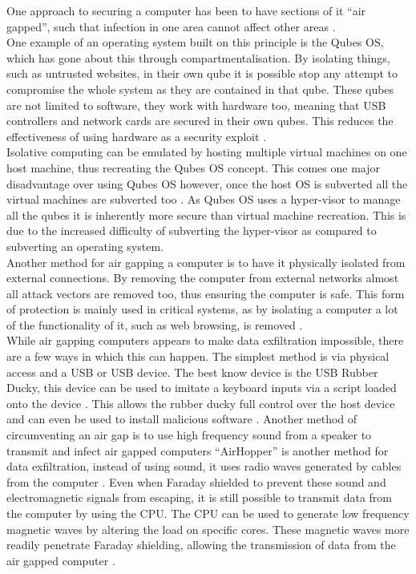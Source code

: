\label{Ch2 Sec3}

One approach to securing a computer has been to have sections of it “air gapped”, such that infection in one area cannot affect other areas \cite{Reference19}.\\

One example of an operating system built on this principle is the Qubes OS, which has gone about this through compartmentalisation.
By isolating things, such as untrusted websites, in their own qube it is possible stop any attempt to compromise the whole system as they are contained in that qube.
These qubes are not limited to software, they work with hardware too, meaning that USB controllers and network cards are secured in their own qubes.
This reduces the effectiveness of using hardware as a security exploit \cite{Reference20}.\\

Isolative computing can be emulated by hosting multiple virtual machines on one host machine, thus recreating the Qubes OS concept.
This comes one major disadvantage over using Qubes OS however, once the host OS is subverted all the virtual machines are subverted too \cite{Reference21}.
As Qubes OS uses a hyper-visor to manage all the qubes it is inherently more secure than virtual machine recreation.
This is due to the increased difficulty of subverting the hyper-visor as compared to subverting an operating system.\\

Another method for air gapping a computer is to have it physically isolated from external connections.
By removing the computer from external networks almost all attack vectors are removed too, thus ensuring the computer is safe.
This form of protection is mainly used in critical systems, as by isolating a computer a lot of the functionality of it, such as web browsing, is removed \cite{Reference22}.\\

While air gapping computers appears to make data exfiltration impossible, there are a few ways in which this can happen.
The simplest method is via physical access and a USB or USB device.
The best know device is the USB Rubber Ducky, this device can be used to imitate a keyboard inputs via a script loaded onto the device \cite{Reference23}.
This allows the rubber ducky full control over the host device and can even be used to install malicious software \cite{Reference23}.
Another method of circumventing an air gap is to use high frequency sound from a speaker to transmit and infect air gapped computers \cite{Reference24} “AirHopper” is another method for data exfiltration, instead of using sound, it uses radio waves generated by cables from the computer \cite{Reference25}.
Even when Faraday shielded to prevent these sound and electromagnetic signals from escaping, it is still possible to transmit data from the computer by using the CPU.
The CPU can be used to generate low frequency magnetic waves by altering the load on specific cores.
These magnetic waves more readily penetrate Faraday shielding, allowing the transmission of data from the air gapped computer \cite{Reference26}.

